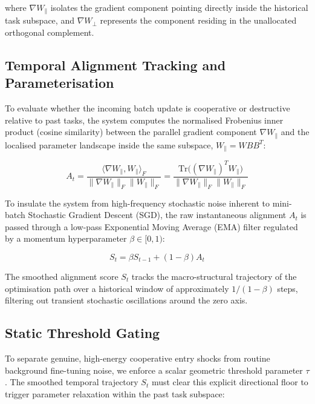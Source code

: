 \documentclass[10pt,a4paper]{article}
\begin{document}
		where $\nabla W_{\parallel}$ isolates the gradient component pointing directly inside the historical task subspace, and $\nabla W_{\perp}$ represents the component residing in the unallocated orthogonal complement. 
		
		\subsection{Temporal Alignment Tracking and Parameterisation}
		
		To evaluate whether the incoming batch update is cooperative or destructive relative to past tasks, the system computes the normalised Frobenius inner product (cosine similarity) between the parallel gradient component $\nabla W_{\parallel}$ and the localised parameter landscape inside the same subspace, $W_{\parallel} = W B B^T$:
		
		\begin{equation}
			A_t = \frac{\langle \nabla W_{\parallel}, W_{\parallel} \rangle_F}{\|\nabla W_{\parallel}\|_F \|W_{\parallel}\|_F} = \frac{\text{Tr}\big((\nabla W_{\parallel})^T W_{\parallel}\big)}{\|\nabla W_{\parallel}\|_F \|W_{\parallel}\|_F}
		\end{equation}
		
		To insulate the system from high-frequency stochastic noise inherent to mini-batch Stochastic Gradient Descent (SGD), the raw instantaneous alignment $A_t$ is passed through a low-pass Exponential Moving Average (EMA) filter regulated by a momentum hyperparameter $\beta \in [0, 1)$:
		
		\begin{equation}
			S_t = \beta S_{t-1} + (1 - \beta) A_t
		\end{equation}
		
		The smoothed alignment score $S_t$ tracks the macro-structural trajectory of the optimisation path over a historical window of approximately $1/(1-\beta)$ steps, filtering out transient stochastic oscillations around the zero axis.
		
		\subsection{Static Threshold Gating}
		
		To separate genuine, high-energy cooperative entry shocks from routine background fine-tuning noise, we enforce a scalar geometric threshold parameter $\tau$. The smoothed temporal trajectory $S_t$ must clear this explicit directional floor to trigger parameter relaxation within the past task subspace:
		
\end{document}
